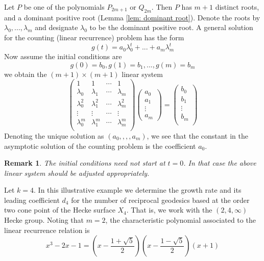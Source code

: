 \documentclass[11pt]{amsart}
\numberwithin{equation}{section}
\theoremstyle{plain}
\newtheorem{rem}[thm]{Remark}
\begin{document}
Let $P$ be one of the polynomials $P_{2m+1}$ or $Q_{2m}$.
Then $P$ has $m+1$ distinct roots, and a  dominant positive root  (Lemma \ref{lem: dominant root}).  Denote the roots by $\lambda_{0},...,\lambda_{m}$ and designate $\lambda_{0}$ to be  the dominant positive root. A general solution for the counting (linear recurrence)  problem has the form
\begin{displaymath}
g(t)=a_{0}\lambda_{0}^{t}+...+a_m \lambda_{m}^{t}
\end{displaymath}
Now assume the initial conditions are 
$$
g(0)=b_{0},  g(1)=b_{1},..., g(m)=b_{m}
$$
we obtain  the $(m+1) \times (m+1)$ linear system 
\begin{equation}
\begin{pmatrix}
     1 & 1 & \cdots & 1  \\
   \lambda_{0} & \lambda_{1} & \cdots & \lambda_{m}  \\
  \lambda_{0}^{2} & \lambda_{1}^{2} & \cdots & \lambda_{m}^{2}  \\
\vdots& \vdots & \cdots & \vdots \\
  \lambda_{0}^{m} & \lambda_{1}^{m} & \cdots & \lambda_{m}^{m}  \\
\end{pmatrix}
\begin{pmatrix}
      a_{0}   \\
      a_{1}   \\
      \vdots     \\
       a_{m}
\end{pmatrix}
=
\begin{pmatrix}
    b_{0}   \\
    b_{1}     \\
    \vdots     \\
    b_{m}    \\
\end{pmatrix}
\end{equation}
Denoting the unique solution as $(a_{0},,,,a_{m})$, we see that 
the constant in the asymptotic solution of the counting problem is the coefficient $a_{0}$. 

\begin{rem} The initial conditions need not start at $t=0$. In that case the above linear system should  be adjusted appropriately. 
\end{rem}

 Let $k=4$. In this illustrative example we determine the growth rate and its leading coefficient  $d_4$ for the
number of reciprocal geodesics based at the order two cone point of the Hecke surface $X_{4}$. That is, we work with the $(2,4,\infty)$ Hecke group.  Noting that $m=2$, the characteristic polynomial associated to the linear recurrence relation is
\begin{displaymath}
x^{3}-2x-1=
 \left(x-\frac{1+\sqrt{5}}{2}\right)
 \left(x-\frac{1-\sqrt{5}}{2}\right)
\left( x+1\right)
\end{displaymath}
\end{document}
